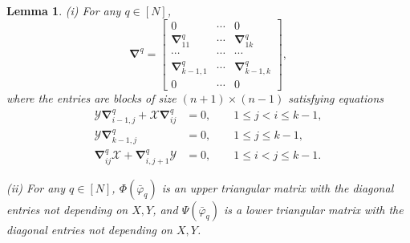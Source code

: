 \documentclass{amsart}
\newtheorem{lemma}[theorem]{Lemma}
\theoremstyle{definition}
\theoremstyle{remark}
\numberwithin{equation}{section}
\numberwithin{theorem}{section}
\begin{document}
\begin{lemma}\label{gradfi}
{\rm (i)} For any $q\in [N]$,
 \begin{equation}\label{aux0}
{\boldsymbol\nabla}^q=
\left [\begin{array}{ccc} 0& \cdots & 0\\ {\boldsymbol\nabla}^q_{11} & \cdots &{\boldsymbol\nabla}^q_{1k} \\ 
\cdots &\cdots &\cdots\\
{\boldsymbol\nabla}^q_{k-1,1} & \cdots &{\boldsymbol\nabla}^q_{k-1,k} \\  0 & \cdots & 0
\end{array}\right ],
\end{equation}
where the entries  are blocks of size $(n+1)\times (n-1)$ satisfying equations
\begin{equation}\label{aux1}
 \begin{aligned}
{{\mathcal Y}} {\boldsymbol\nabla}^q_{i-1,j} + {{\mathcal X}} {\boldsymbol\nabla}^q_{i j} &= 0, \qquad 1\leq j<i\leq k-1, \\ 
{{\mathcal Y}} {\boldsymbol\nabla}^q_{k-1,j} &= 0, \qquad 1\leq j\leq k-1,\\ 
{\boldsymbol\nabla}^q_{i j}{{\mathcal X}} + {\boldsymbol\nabla}^q_{i,j+1}{{\mathcal Y}}&=0, \qquad 1\leq i<j\leq k-1.
\end{aligned}
\end{equation}

{\rm (ii)}  For any $q\in [N]$, ${\Phi}(\bar{{\varphi}}_q)$ is an upper triangular matrix with the diagonal
entries not depending on $X, Y$, and ${\Psi}(\bar{{\varphi}}_q)$ is a lower triangular matrix with the diagonal
entries not depending on $X, Y$.
\end{lemma}
\end{document}
